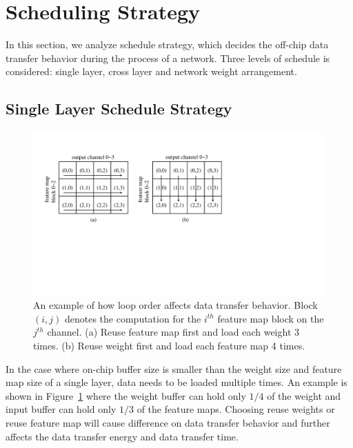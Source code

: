 \documentclass[10pt, conference]{IEEEtran}
\begin{document}
    \section{Scheduling Strategy}
    In this section, we analyze schedule strategy, which decides the off-chip data transfer behavior during the process of a network. Three levels of schedule is considered: single layer, cross layer and network weight arrangement.
    
    \subsection{Single Layer Schedule Strategy}
    
    \begin{figure}[t]
      \centering
      \includegraphics[width=1\columnwidth]{fig/single_layer.pdf}
      \caption{An example of how loop order affects data transfer behavior. Block $(i, j)$ denotes the computation for the $i^{th}$ feature map block on the $j^{th}$ channel. (a) Reuse feature map first and load each weight 3 times. (b) Reuse weight first and load each feature map 4 times.}
      \label{fig:single_layer}
    \end{figure}
    
    In the case where on-chip buffer size is smaller than the weight size and feature map size of a single layer, data needs to be loaded multiple times. An example is shown in Figure~\ref{fig:single_layer} where the weight buffer can hold only $1/4$ of the weight and input buffer can hold only $1/3$ of the feature maps. Choosing reuse weights or reuse feature map will cause difference on data transfer behavior and further affects the data transfer energy and data transfer time.
    
\end{document}
